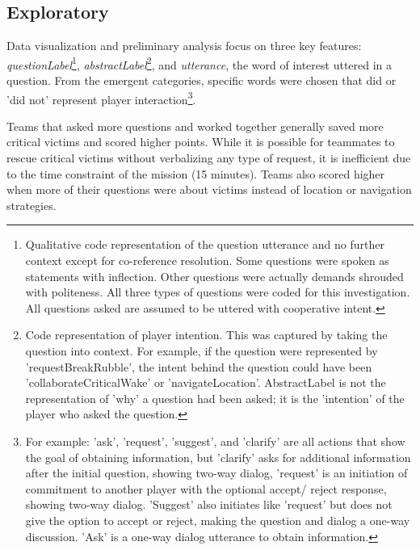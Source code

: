 \subsection{Exploratory}
Data visualization and preliminary analysis focus on three
key features: \textit{questionLabel}\footnote{Qualitative code representation of the
question utterance and no further context except for co-reference resolution.
Some questions were spoken as statements with inflection. Other questions were
actually demands shrouded with politeness. All three types of questions were
coded for this investigation. All questions asked are assumed to be uttered
with cooperative intent.}, \textit{abstractLabel}\footnote{Code representation of
player intention. This was captured by taking the question into context. For
example, if the question were represented by 'requestBreakRubble', the intent
behind the question could have been 'collaborateCriticalWake' or
'navigateLocation'. AbstractLabel is not the representation of 'why' a
question had been asked; it is the 'intention' of the player who asked the
question.}, and \textit{utterance}, the word of interest uttered in a question. From
the emergent categories, specific words were chosen that did or 'did not'
represent player interaction\footnote{For example: 'ask', 'request',
'suggest', and 'clarify' are all actions that show the goal of
obtaining information, but 'clarify' asks for additional information after the
initial question, showing two-way dialog, 'request' is an initiation of
commitment to another player with the optional accept/ reject response, showing
two-way dialog. 'Suggest' also initiates like 'request' but does not give the
option to accept or reject, making the question and dialog a one-way
discussion. 'Ask' is a one-way dialog utterance to obtain information.}.



Teams that asked more questions and worked together generally saved more
critical victims and scored higher points. While it is possible for teammates
to rescue critical victims without verbalizing any type of request, it is
inefficient due to the time constraint of the mission (15 minutes). Teams also
scored higher when more of their questions were about victims instead of
location or navigation strategies.

